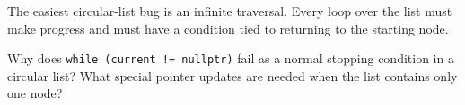 \begin{pitfall}
The easiest circular-list bug is an infinite traversal. Every loop over the list must make progress and must have a condition tied to returning to the starting node.
\end{pitfall}

\begin{quickcheck}
Why does \texttt{while (current != nullptr)} fail as a normal stopping condition in a circular list? What special pointer updates are needed when the list contains only one node?
\end{quickcheck}


